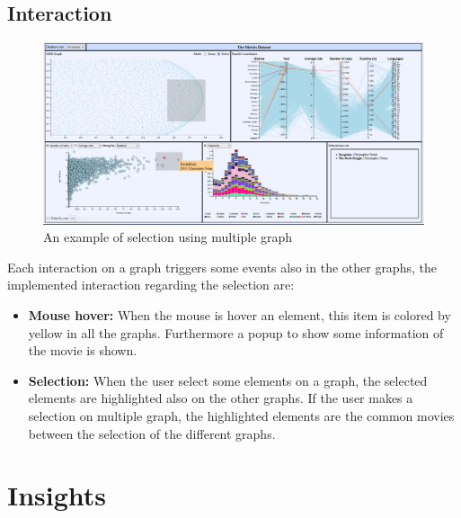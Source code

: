 \documentclass[]{article}
\begin{document}
\subsection{Interaction}
\begin{figure}[H]
	\centering
	\includegraphics[width=1\linewidth]{images/interaction1}
	\caption[Interaction example]{An example of selection using multiple graph}
	\label{fig:interaction1}
\end{figure}
Each interaction on a graph triggers some events also in the other graphs, the implemented interaction regarding the selection are:
\begin{itemize}
	\item \textbf{Mouse hover:} When the mouse is hover an element, this item is colored by yellow in all the graphs. Furthermore a popup to show some information of the movie is shown.
	\item \textbf{Selection:} When the user select some elements on a graph, the selected elements are highlighted also on the other graphs. If the user makes a selection on multiple graph, the highlighted elements are the common movies between the selection of the different graphs.
\end{itemize}
\section{Insights}
\end{document}
